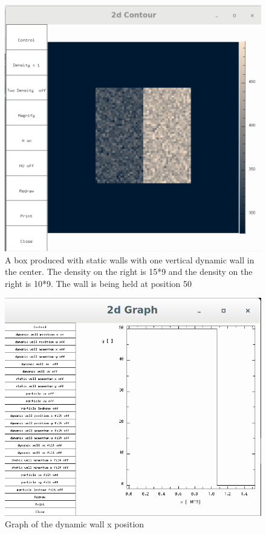 \documentclass{article}
\begin{document}
\begin{figure}[H]
\includegraphics[scale=0.2]{A1p1.png}
\caption{\label{fig}  A box produced with static walls with one vertical dynamic wall in the center. The density on the right is 15*9 and the density on the right is 10*9. The wall is being held at position 50}
\end{figure}

\begin{figure}[H]
\includegraphics[scale=0.2]{A1p2.png}
\caption{\label{fig} Graph of the dynamic wall x position}
\end{figure}
\end{document}
